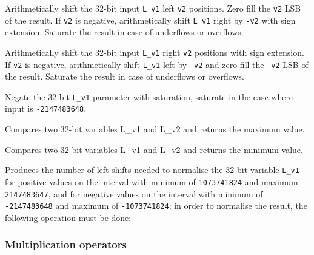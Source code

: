 
Arithmetically shift the 32-bit input {\tt L\_v1} left {\tt v2} positions.
Zero fill the {\tt v2} LSB of the result.
If {\tt v2} is negative, arithmetically shift {\tt L\_v1} right by {\tt -v2} with sign extension.
Saturate the result in case of underflows or overflows.


Arithmetically shift the 32-bit input {\tt L\_v1} right {\tt v2} positions with sign extension.
If {\tt v2} is negative, arithmetically shift {\tt L\_v1} left by {\tt -v2} and zero fill the {\tt -v2} LSB of the result.
Saturate the result in case of underflows or overflows.



Negate the 32-bit {\tt L\_v1} parameter with saturation, saturate in the case where input is {\tt -2147483648}.

 

Compares two 32-bit variables L\_v1 and L\_v2 and returns the maximum value.

 

Compares two 32-bit variables L\_v1 and L\_v2 and returns the minimum value.


Produces the number of left shifts needed to normalise the 32-bit variable {\tt L\_v1} for positive values on the interval with
minimum of {\tt 1073741824} and maximum {\tt 2147483647}, and for negative values on the interval with minimum of {\tt -2147483648} and maximum of {\tt -1073741824};
in order to normalise the result, the following operation must be done:


\subsubsection{Multiplication operators}

